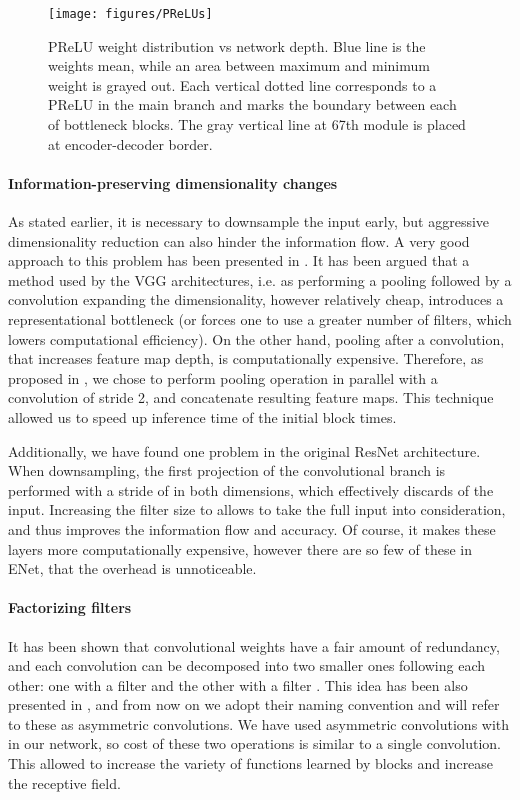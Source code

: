 \documentclass{article}
\begin{document}
\begin{figure}[!t]
  \centering
  \texttt{[image: figures/PReLUs]}
  \caption{
    PReLU weight distribution vs network depth.
    Blue line is the weights mean, while an area between maximum and minimum weight is grayed out.
    Each vertical dotted line corresponds to a PReLU in the main branch and marks the boundary between each of bottleneck blocks.
    The gray vertical line at 67th module is placed at encoder-decoder border.
  }
  \vspace{0.05in}
  \label{fig:PReLU}
\end{figure}

\paragraph{Information-preserving dimensionality changes}
As stated earlier, it is necessary to downsample the input early, but aggressive dimensionality reduction can also hinder the information flow.
A very good approach to this problem has been presented in \cite{szegedy2015rethinking}.
It has been argued that a method used by the VGG architectures, i.e. as performing a pooling followed by a convolution expanding the dimensionality, however relatively cheap, introduces a representational bottleneck (or forces one to use a greater number of filters, which lowers computational efficiency).
On the other hand, pooling after a convolution, that increases feature map depth, is computationally expensive.
Therefore, as proposed in \cite{szegedy2015rethinking}, we chose to perform pooling operation in parallel with a convolution of stride 2, and concatenate resulting feature maps. This technique allowed us to speed up inference time of the initial block  times.

Additionally, we have found one problem in the original ResNet architecture.
When downsampling, the first  projection of the convolutional branch is performed with a stride of  in both dimensions, which effectively discards  of the input.
Increasing the filter size to  allows to take the full input into consideration, and thus improves the information flow and accuracy.
Of course, it makes these layers  more computationally expensive, however there are so few of these in ENet, that the overhead is unnoticeable.

\paragraph{Factorizing filters}
It has been shown that convolutional weights have a fair amount of redundancy, and each  convolution can be decomposed into two smaller ones following each other: one with a  filter and the other with a  filter \cite{jin2014flattened}.
This idea has been also presented in \cite{szegedy2015rethinking}, and from now on we adopt their naming convention and will refer to these as asymmetric convolutions.
We have used asymmetric convolutions with  in our network, so cost of these two operations is similar to a single  convolution.
This allowed to increase the variety of functions learned by blocks and increase the receptive field.
\end{document}

